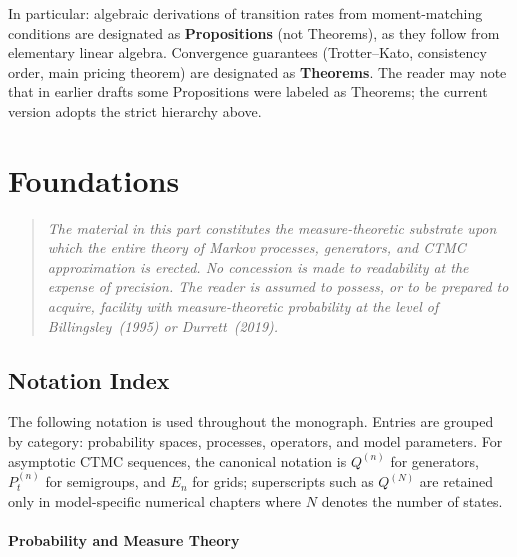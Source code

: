 \documentclass[11pt,a4paper,openany]{book}
\theoremstyle{definition}
\theoremstyle{plain}
\theoremstyle{remark}
\newcommand{\1}{\mathbbm{1}}
\begin{document}
\noindent In particular: algebraic derivations of transition rates from moment-matching conditions are designated as \textbf{Propositions} (not Theorems), as they follow from elementary linear algebra. Convergence guarantees (Trotter--Kato, consistency order, main pricing theorem) are designated as \textbf{Theorems}. The reader may note that in earlier drafts some Propositions were labeled as Theorems; the current version adopts the strict hierarchy above.

\newpage

\part{Foundations}

\begin{quote}
\itshape The material in this part constitutes the measure-theoretic substrate upon which the entire theory of Markov processes, generators, and CTMC approximation is erected. No concession is made to readability at the expense of precision. The reader is assumed to possess, or to be prepared to acquire, facility with measure-theoretic probability at the level of Billingsley~(1995) or Durrett~(2019).
\end{quote}

\newpage

\chapter*{Notation Index}

\noindent The following notation is used throughout the monograph. Entries are grouped by category: probability spaces, processes, operators, and model parameters. For asymptotic CTMC sequences, the canonical notation is $Q^{(n)}$ for generators, $P_t^{(n)}$ for semigroups, and $E_n$ for grids; superscripts such as $Q^{(N)}$ are retained only in model-specific numerical chapters where $N$ denotes the number of states.

\subsection*{Probability and Measure Theory}
\end{document}
